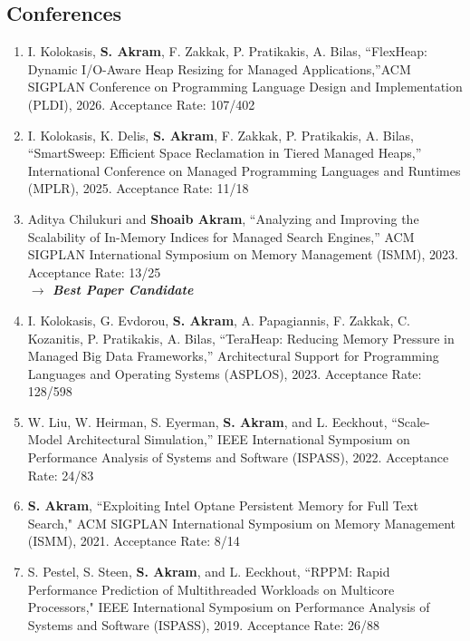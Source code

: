 \documentclass[singlecolumn,singlespace,11pt,a4paper]{article}
\begin{document}
\subsection*{Conferences}
\begin{enumerate}

\item 
I. Kolokasis, \textbf{S. Akram}, F. Zakkak, P. Pratikakis, A. Bilas, ``FlexHeap: Dynamic I/O-Aware Heap Resizing for Managed Applications,''ACM SIGPLAN Conference on Programming Language Design and Implementation (PLDI), 2026. {\color{blue} Acceptance Rate: 107/402}


\item 
I. Kolokasis, K. Delis, \textbf{S. Akram}, F. Zakkak, P. Pratikakis, A. Bilas, ``SmartSweep: Efficient Space Reclamation in Tiered Managed Heaps,'' International Conference on Managed Programming Languages and Runtimes (MPLR), 2025. {\color{blue} Acceptance Rate: 11/18}


\item
Aditya Chilukuri and \textbf{Shoaib Akram}, ``Analyzing and Improving the Scalability of In-Memory Indices for Managed Search Engines,'' ACM SIGPLAN International Symposium on Memory Management (ISMM), 2023. {\color{blue} Acceptance Rate: 13/25}
\\
{\color{BrickRed} \textbf{$\longrightarrow$ \emph{Best Paper Candidate}}}

\item 
I. Kolokasis, G. Evdorou, \textbf{S. Akram}, A. Papagiannis, F. Zakkak, C. Kozanitis, P. Pratikakis, A. Bilas, ``TeraHeap: Reducing Memory Pressure in Managed Big Data Frameworks,'' Architectural Support for Programming Languages and Operating Systems (ASPLOS), 2023. {\color{blue} Acceptance Rate: 128/598}

\item
W. Liu, W. Heirman, S. Eyerman, \textbf{S. Akram}, and L. Eeckhout,
``Scale-Model Architectural Simulation,'' IEEE International Symposium on
Performance Analysis of Systems and Software (ISPASS), 2022. {\color{blue} Acceptance Rate: 24/83}

\item
\textbf{S. Akram}, ``Exploiting Intel Optane Persistent Memory for Full Text Search," ACM SIGPLAN International Symposium on Memory Management (ISMM), 2021. {\color{blue} Acceptance Rate: 8/14}

\item
S. Pestel, S. Steen, \textbf{S. Akram}, and L. Eeckhout, ``RPPM: Rapid Performance Prediction of Multithreaded Workloads on Multicore Processors," IEEE International Symposium on Performance Analysis of Systems and Software (ISPASS), 2019. {\color{blue} Acceptance Rate: 26/88}


\end{enumerate}
\end{document}
